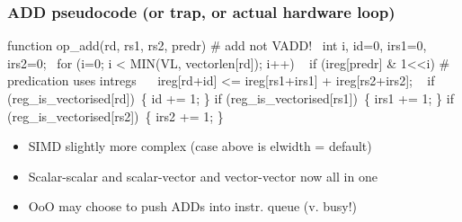 \documentclass[slidestop]{beamer}
\begin{document}
\begin{frame}[fragile]
\frametitle{ADD pseudocode (or trap, or actual hardware loop)}

\begin{semiverbatim}
function op_add(rd, rs1, rs2, predr) # add not VADD!
  int i, id=0, irs1=0, irs2=0;
  for (i=0; i < MIN(VL, vectorlen[rd]); i++)
    if (ireg[predr] & 1<<i) # predication uses intregs
       ireg[rd+id] <= ireg[rs1+irs1] + ireg[rs2+irs2];
    if (reg_is_vectorised[rd]) \{ id += 1; \}
    if (reg_is_vectorised[rs1]) \{ irs1 += 1; \}
    if (reg_is_vectorised[rs2]) \{ irs2 += 1; \}
\end{semiverbatim}
  \begin{itemize}
   \item SIMD slightly more complex (case above is elwidth = default)  
   \item Scalar-scalar and scalar-vector and vector-vector now all in one
   \item OoO may choose to push ADDs into instr. queue (v. busy!)
  \end{itemize}
\end{frame}

\end{document}
